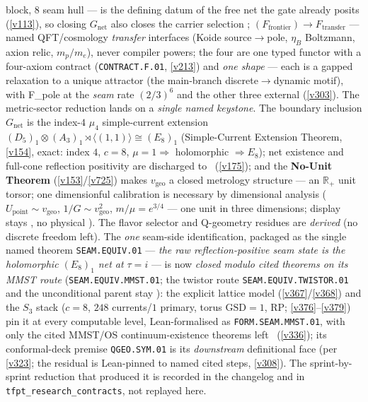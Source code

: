 \documentclass[11pt,a4paper]{article}
\begin{document}
block, $8$ seam hull --- is the defining datum of the free net the gate already posits (\vref{v113}), so
closing $G_{\mathrm{net}}$ also closes the carrier selection \mE; $(F_{\mathrm{frontier}})\to F_{\mathrm{transfer}}$
--- named QFT/cosmology \emph{transfer} interfaces (Koide source$\to$pole, $\eta_B$ Boltzmann, axion relic,
$m_p/m_e$), never compiler powers; the four are one typed functor with a four-axiom contract
(\texttt{CONTRACT.F.01}, \vref{v213}) and \emph{one shape} --- each is a gapped relaxation to a unique attractor
(the main-branch discrete$\to$dynamic motif), with F\_pole at the \emph{seam} rate $(2/3)^6$ and the other three
external (\vref{v303}). The metric-sector reduction lands on a \emph{single named keystone}. The boundary inclusion
$G_{\mathrm{net}}$ is the index-$4$ $\mu_4$ simple-current extension
$(D_5)_1{\otimes}(A_3)_1{\rtimes}\langle(1,1)\rangle\cong(E_8)_1$ (Simple-Current Extension Theorem,
\vref{v154}, exact: index $4$, $c{=}8$, $\mu{=}1\Rightarrow$ holomorphic $\Rightarrow E_8$); net
existence and full-cone reflection positivity are discharged to \mE\ (\vref{v175}); and the
\textbf{No-Unit Theorem} (\vref{v153}/\vref{v725}) makes $v_{\mathrm{geo}}$ a
closed metrology structure --- an $\mathbb{R}_+$ unit torsor; one dimensionful
calibration is necessary by dimensional analysis
($U_{\mathrm{point}}\sim v_{\mathrm{geo}}$, $1/G\sim v_{\mathrm{geo}}^2$, $m/\mu=e^{3/4}$ --- one unit in
three dimensions; display stays \mO, no physical \mE). The flavor selector and Q-geometry residues are \emph{derived} (no discrete freedom
left). The \emph{one} seam-side identification, packaged as the single named
theorem \texttt{SEAM.EQUIV.01} --- \emph{the raw reflection-positive seam state is the holomorphic
$(E_8)_1$ net at $\tau{=}i$} --- is now \emph{closed modulo cited theorems on its MMST route}
(\texttt{SEAM.EQUIV.MMST.01}; the twistor route \texttt{SEAM.EQUIV.TWISTOR.01} and the unconditional parent stay
\mO): the explicit lattice model
(\vref{v367}/\vref{v368}) and the $S_3$ stack ($c{=}8$, $248$ currents/$1$ primary, torus $\mathrm{GSD}{=}1$, RP;
\vref{v376}--\vref{v379}) pin it at every computable level, Lean-formalised as \texttt{FORM.SEAM.MMST.01}, with only
the cited MMST/OS continuum-existence theorems left \mO\ (\vref{v336}); its conformal-deck premise
\texttt{QGEO.SYM.01} is its \emph{downstream} definitional face (per \vref{v323}; the residual is Lean-pinned to named
cited steps, \vref{v308}). The
sprint-by-sprint reduction that produced it is recorded in the changelog and in
\texttt{tfpt\_research\_contracts}, not replayed here.
\end{document}
